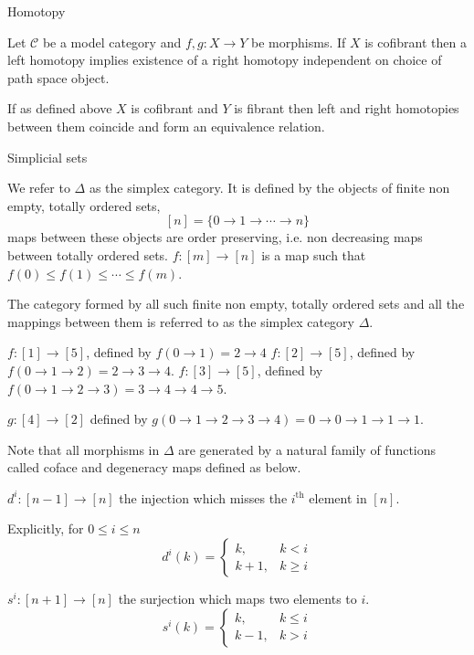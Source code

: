 \documentclass[10pt]{beamer}
\begin{document}
\begin{frame}{Homotopy}
	\begin{lemma}
		Let $\mathcal{C}$ be a model category and $f,g : X \to Y$ be morphisms. If $X$ is cofibrant then a left homotopy implies existence of a right homotopy independent on choice of path space object.
	\end{lemma}
	
	\begin{corollary}
		If as defined above $X$ is cofibrant and $Y$ is fibrant then left and right homotopies between them coincide and form an equivalence relation.
	\end{corollary}
\end{frame}

\begin{frame}{Simplicial sets}
		\begin{definition}
		We refer to $\Delta$ as the simplex category. It is defined by the objects of finite non empty, totally ordered sets,
		\[ [n]=\{0 \to 1 \to \cdots \to n\} \]
		maps between these objects are order preserving, i.e. non decreasing maps between totally ordered sets.
		$f: [m] \to [n]$ is a map such that $f(0) \leq f(1) \leq \cdots \leq f(m)$.
		
		The category formed by all such finite non empty, totally ordered sets and all the mappings between them is referred to as the simplex category $\Delta$.
	\end{definition}
	\pagebreak
		\begin{example}
		\( f:[1]\to[5] \), defined by \( f(0 \to 1)= 2 \to 4 \)
		$f:[2] \to [5]$, defined by $f(0 \to 1 \to 2) = 2 \to 3 \to 4$.
		\( f:[3] \to [5] \), defined by \( f(0 \to 1 \to 2 \to 3)=3 \to 4 \to 4 \to 5 \).
		
	\end{example}	
	\begin{example}
		
		$g:[4] \to [2]$ defined by $g(0 \to 1 \to 2\to 3 \to 4) = 0\to 0 \to 1 \to 1 \to 1.$		
	\end{example}
		\pagebreak
	Note that all morphisms in $\Delta$ are generated by a natural family of functions called coface and degeneracy maps defined as below.
	\begin{definition}
		$d^i:[n-1] \to [n]$ the injection which misses the $i^\mathrm{th}$ element in $[n]$.
		
		Explicitly, for $0 \leq i \leq n$
		\[
		d^i(k) =
		\begin{cases}
			k, & k < i \\
			k + 1, & k \geq i
		\end{cases}
		\]
	\end{definition}
	\begin{definition}
		$s^i:[n+1]\to[n]$ the surjection which maps two elements to $i$.
		\[
		s^i(k) =
		\begin{cases}
			k, & k \leq i \\
			k - 1, & k > i
		\end{cases}
		\]
	\end{definition}
	

\end{frame}
\end{document}
